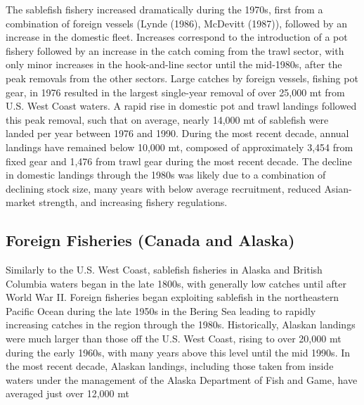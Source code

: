 \documentclass[11pt,
  english,
  a4paper,
]{article}
\begin{document}
The sablefish fishery increased dramatically during the 1970s, first from a combination of foreign vessels ({Lynde (1986)\leavevmode\tagmcend\tagstructend}, {McDevitt (1987)\leavevmode\tagmcend\tagstructend}), followed by an increase in the domestic fleet. Increases correspond to the introduction of a pot fishery followed by an increase in the catch coming from the trawl sector, with only minor increases in the hook-and-line sector until the mid-1980s, after the peak removals from the other sectors. Large catches by foreign vessels, fishing pot gear, in 1976 resulted in the largest single-year removal of over 25,000 mt from U.S. West Coast waters. A rapid rise in domestic pot and trawl landings followed this peak removal, such that on average, nearly 14,000 mt of sablefish were landed per year between 1976 and 1990. During the most recent decade, annual landings have remained below 10,000 mt, composed of approximately 3,454 from fixed gear and 1,476 from trawl gear during the most recent decade. The decline in domestic landings through the 1980s was likely due to a combination of declining stock size, many years with below average recruitment, reduced Asian-market strength, and increasing fishery regulations.

\leavevmode\tagmcend\tagstructend\par


\hypertarget{foreign-fisheries-canada-and-alaska}{%
\subsection{Foreign Fisheries (Canada and Alaska)}\label{foreign-fisheries-canada-and-alaska}}

\leavevmode\tagmcend\tagstructend

Similarly to the U.S. West Coast, sablefish fisheries in Alaska and British Columbia waters began in the late 1800s, with generally low catches until after World War II. Foreign fisheries began exploiting sablefish in the northeastern Pacific Ocean during the late 1950s in the Bering Sea leading to rapidly increasing catches in the region through the 1980s. Historically, Alaskan landings were much larger than those off the U.S. West Coast, rising to over 20,000 mt during the early 1960s, with many years above this level until the mid 1990s. In the most recent decade, Alaskan landings, including those taken from inside waters under the management of the Alaska Department of Fish and Game, have averaged just over 12,000 mt
\end{document}
